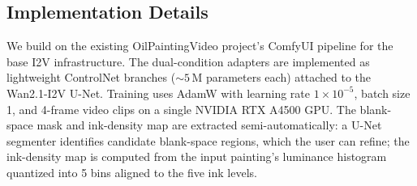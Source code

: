\subsection{Implementation Details}

We build on the existing OilPaintingVideo project's ComfyUI
pipeline for the base I2V infrastructure. The dual-condition
adapters are implemented as lightweight ControlNet branches
(${\sim}5$\,M parameters each) attached to the Wan2.1-I2V U-Net.
Training uses AdamW with learning rate $1 \times 10^{-5}$, batch
size 1, and 4-frame video clips on a single NVIDIA RTX A4500 GPU.
The blank-space mask and ink-density map are extracted
semi-automatically: a U-Net segmenter identifies candidate
blank-space regions, which the user can refine; the ink-density
map is computed from the input painting's luminance histogram
quantized into 5 bins aligned to the five ink levels.
